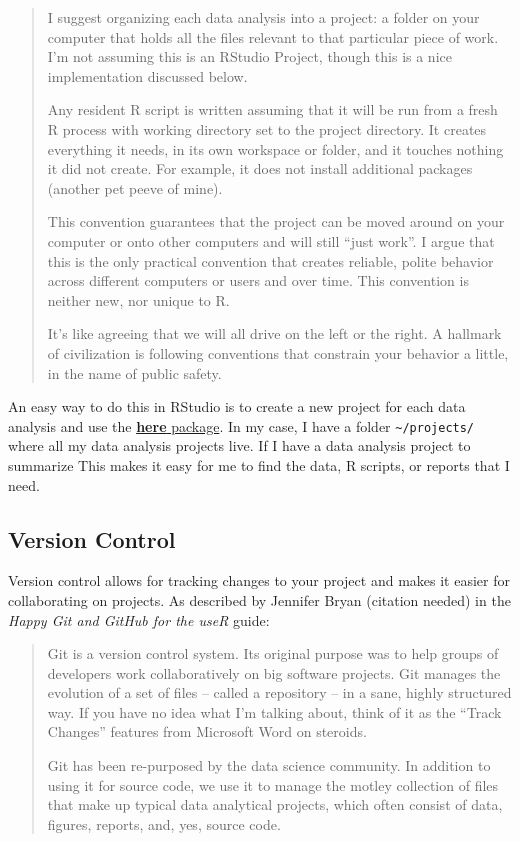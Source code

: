 \documentclass[
  letterpaper,
  DIV=11,
  numbers=noendperiod]{scrreprt}
\begin{document}
\begin{quote}
I suggest organizing each data analysis into a project: a folder on your
computer that holds all the files relevant to that particular piece of
work. I'm not assuming this is an RStudio Project, though this is a nice
implementation discussed below.

Any resident R script is written assuming that it will be run from a
fresh R process with working directory set to the project directory. It
creates everything it needs, in its own workspace or folder, and it
touches nothing it did not create. For example, it does not install
additional packages (another pet peeve of mine).

This convention guarantees that the project can be moved around on your
computer or onto other computers and will still ``just work''. I argue
that this is the only practical convention that creates reliable, polite
behavior across different computers or users and over time. This
convention is neither new, nor unique to R.

It's like agreeing that we will all drive on the left or the right. A
hallmark of civilization is following conventions that constrain your
behavior a little, in the name of public safety.
\end{quote}

An easy way to do this in RStudio is to create a new project for each
data analysis and use the \href{https://here.r-lib.org/}{\textbf{here}
package}. In my case, I have a folder
\texttt{\textasciitilde{}/projects/} where all my data analysis projects
live. If I have a data analysis project to summarize This makes it easy
for me to find the data, R scripts, or reports that I need.

\hypertarget{version-control}{%
\subsection{Version Control}\label{version-control}}

Version control allows for tracking changes to your project and makes it
easier for collaborating on projects. As described by Jennifer Bryan
(citation needed) in the \emph{Happy Git and GitHub for the useR} guide:

\begin{quote}
Git is a version control system. Its original purpose was to help groups
of developers work collaboratively on big software projects. Git manages
the evolution of a set of files -- called a repository -- in a sane,
highly structured way. If you have no idea what I'm talking about, think
of it as the ``Track Changes'' features from Microsoft Word on steroids.

Git has been re-purposed by the data science community. In addition to
using it for source code, we use it to manage the motley collection of
files that make up typical data analytical projects, which often consist
of data, figures, reports, and, yes, source code.
\end{quote}
\end{document}
